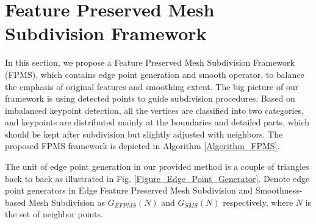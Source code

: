 \documentclass[10pt, conference, compsocconf]{IEEEtran}
\begin{document}

\section{Feature Preserved Mesh Subdivision Framework}\label{Section:Keypoint based Feature Preserved Mesh Subdivision Scheme}
In this section, we propose a Feature Preserved Mesh Subdivision Framework (FPMS), which contains edge point generation and smooth operator, to balance the emphasis of original features and smoothing extent. The big picture of our framework is using detected points to guide subdivision procedures. Based on imbalanced keypoint detection, all the vertices are classified into two categories, and keypoints are distributed mainly at the boundaries and detailed parts, which should be kept after subdivision but slightly adjusted with neighbors. The proposed FPMS framework is depicted in Algorithm \ref{Algorithm_FPMS}.

The unit of edge point generation in our provided method is a couple of triangles back to back as illustrated in Fig. \ref{Figure_Edge_Point_Generator}. Denote edge point generators in Edge Feature Preserved Mesh Subdivision and Smoothness-based Mesh Subdivision as $G_{EFPMS}(N)$ and $G_{SMS}(N)$ respectively, where $N$ is the set of neighbor points.
\end{document}
